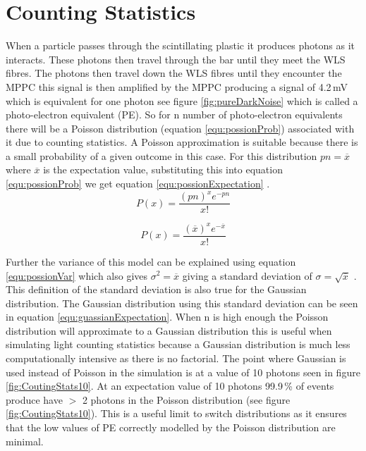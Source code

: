 \section{Counting Statistics} \label{sec:geant4Simulation_countingStats}
When a particle passes through the scintillating plastic it produces photons as it interacts. These photons then travel through the bar until they meet the WLS fibres. The photons then travel down the WLS fibres until they encounter the MPPC  this signal is then amplified by the MPPC producing a signal of 4.2\,mV which is equivalent for one photon see figure \ref{fig:pureDarkNoise} which is called a photo-electron equivalent (PE). So for n number of photo-electron equivalents there will be a Poisson distribution (equation \ref{equ:possionProb}) associated with it due to counting statistics. A Poisson approximation is suitable because there is a small probability of a given outcome in this case. For this distribution $pn = \overline{x}$ where $\overline{x}$ is the expectation value, substituting this into equation \ref{equ:possionProb} we get equation \ref{equ:possionExpectation} \cite{knoll_2010}.
\begin{equation}
P(x) = \frac{(pn)^x e^{-pn}}{x!}  
\label{equ:possionProb}
\end{equation}

\begin{equation}
P(x) = \frac{(\overline{x})^x e^{-\overline{x}}}{x!}  
\label{equ:possionExpectation}
\end{equation}

Further the variance of this model can be explained using equation  \ref{equ:possionVar} which also gives $\sigma^2 = \overline{x}$ giving a standard deviation of $\sigma = \sqrt{\overline{x}}$ \cite{knoll_2010}. This definition of the standard deviation is also true for the Gaussian distribution. The Gaussian distribution using this standard deviation can be seen in equation \ref{equ:guassianExpectation}. When n is high enough the Poisson distribution will approximate to a Gaussian distribution this is useful when simulating light counting statistics because a Gaussian distribution is much less computationally intensive as there is no factorial. The point where Gaussian is used instead of Poisson in the simulation is at a value of 10 photons seen in figure \ref{fig:CoutingStats10}. At an expectation value of 10 photons 99.9\,\% of events produce have $>$ 2 photons in the Poisson distribution (see figure \ref{fig:CoutingStats10}). This is a useful limit to switch distributions as it ensures that the low values of PE correctly modelled by the Poisson distribution are minimal. 

